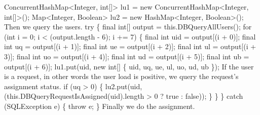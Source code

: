 \eatline
{}\nwendcode{}
\nwenddocs{}\plusendmoddef
  ConcurrentHashMap<Integer, int[]> lu1 = new ConcurrentHashMap<Integer, int[]>();
  Map<Integer, Boolean>             lu2 = new HashMap<Integer, Boolean>();
\nwendcode{}\nwdocspar
{\small Then we query the users.}
\nwenddocs{}\plusendmoddef
  try \{
    final int[] output = this.DBQueryAllUsers();
    for (int i = 0; i < (output.length - 6); i += 7) \{
      final int uid = output[(i + 0)];
      final int  uq = output[(i + 1)];
      final int  ue = output[(i + 2)];
      final int  ul = output[(i + 3)];
      final int  uo = output[(i + 4)];
      final int  ud = output[(i + 5)];
      final int  ub = output[(i + 6)];
      lu1.put(uid, new int[] \{ uid, uq, ue, ul, uo, ud, ub \});
\nwendcode{}\nwdocspar
{\small If the user is a request, in other words the user load is positive,
we query the request's assignment status.}
\nwenddocs{}\plusendmoddef
      if (uq > 0) \{
        lu2.put(uid, (this.DBQueryRequestIsAssigned(uid).length > 0 ? true : false));
      \}
    \}
  \} catch (SQLException e) \{
    throw e;
  \}
\nwendcode{}\nwdocspar
{\small Finally we do the assignment.}
\nwenddocs{}\plusendmoddef
